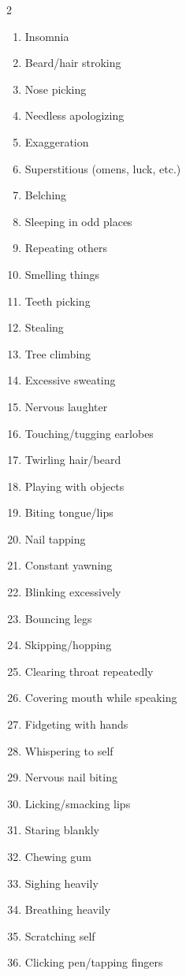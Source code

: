 \begin{multicols}{2}
\begin{enumerate}
        \item Insomnia
        \item Beard/hair stroking
        \item Nose picking
        \item Needless apologizing
        \item Exaggeration
        \item Superstitious (omens, luck, etc.)
        \item Belching
        \item Sleeping in odd places
        \item Repeating others
        \item Smelling things
        \item Teeth picking
        \item Stealing
        \item Tree climbing
        \item Excessive sweating
        \item Nervous laughter
        \item Touching/tugging earlobes
        \item Twirling hair/beard
        \item Playing with objects
        \item Biting tongue/lips
        \item Nail tapping
        \item Constant yawning
        \item Blinking excessively
        \item Bouncing legs
        \item Skipping/hopping
        \item Clearing throat repeatedly
        \item Covering mouth while speaking
        \item Fidgeting with hands
        \item Whispering to self
        \item Nervous nail biting
        \item Licking/smacking lips
        \item Staring blankly
        \item Chewing gum
        \item Sighing heavily
        \item Breathing heavily
        \item Scratching self
        \item Clicking pen/tapping fingers

\end{enumerate}
\end{multicols}
